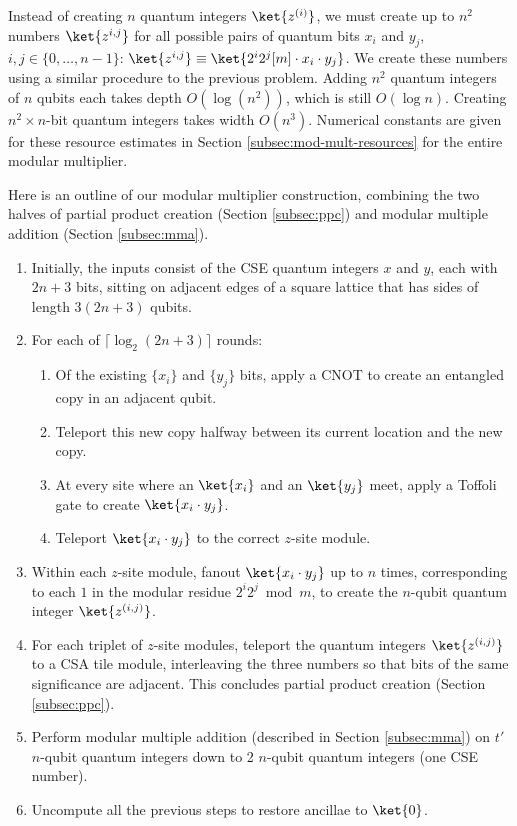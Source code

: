 Instead of creating $n$ quantum integers $\ket{z^{(i)}}$, we must create
up to $n^2$ numbers
$\ket{z^{i,j}}$ for all possible pairs of quantum bits $x_i$ and $y_j$,
$i,j \in \{0,\ldots,n-1\}$:
$\ket{z^{i,j}} \equiv \ket{2^i2^j[m]\cdot x_i \cdot y_j}$.
We create these numbers using a similar procedure to the previous problem.
Adding $n^2$ quantum integers of $n$ qubits each takes depth
$O(\log(n^2))$, which is still $O(\log n)$.
Creating $n^2\times n$-bit quantum integers takes width $O(n^3)$.
Numerical constants are given for these resource estimates in
Section \ref{subsec:mod-mult-resources} for the entire modular multiplier.

Here is an outline of our modular multiplier construction, combining the
two halves of partial product creation (Section \ref{subsec:ppc}) and
modular multiple addition (Section \ref{subsec:mma}).

\begin{enumerate}
\item Initially, the inputs consist of the CSE quantum integers $x$ and $y$,
each with $2n+3$ bits, sitting on adjacent edges of a square lattice that has
sides of length $3(2n+3)$ qubits.
\item For each of $\lceil \log_2 (2n+3) \rceil$ rounds:
\begin{enumerate}
\item Of the existing $\{x_i\}$ and $\{y_j\}$ bits, apply a CNOT to create an
entangled copy in an adjacent qubit.
\item Teleport this new copy halfway between its current location and the
new copy.
\item At every site where an $\ket{x_i}$ and an $\ket{y_j}$ meet,
apply a Toffoli gate to create $\ket{x_i \cdot y_j}$.
\item Teleport $\ket{x_i \cdot y_j}$ to the correct $z$-site module.
\end{enumerate}
\item Within each $z$-site module, fanout $\ket{x_i \cdot y_j}$ up to $n$
times, corresponding to each $1$ in the modular residue $2^i 2^j \bmod m$,
to create the $n$-qubit quantum integer $\ket{z^{(i,j)}}$.
\item For each triplet of $z$-site modules, teleport the quantum integers
$\ket{z^{(i,j)}}$ to a CSA tile module, interleaving the three numbers so that
bits of the same significance are adjacent. This concludes partial product
creation (Section \ref{subsec:ppc}).
\item Perform modular multiple addition (described in Section \ref{subsec:mma})
on $t'$ $n$-qubit quantum integers down to 2 $n$-qubit quantum integers (one CSE number).
\item Uncompute all the previous steps to restore ancillae to $\ket{0}$.
\end{enumerate}
